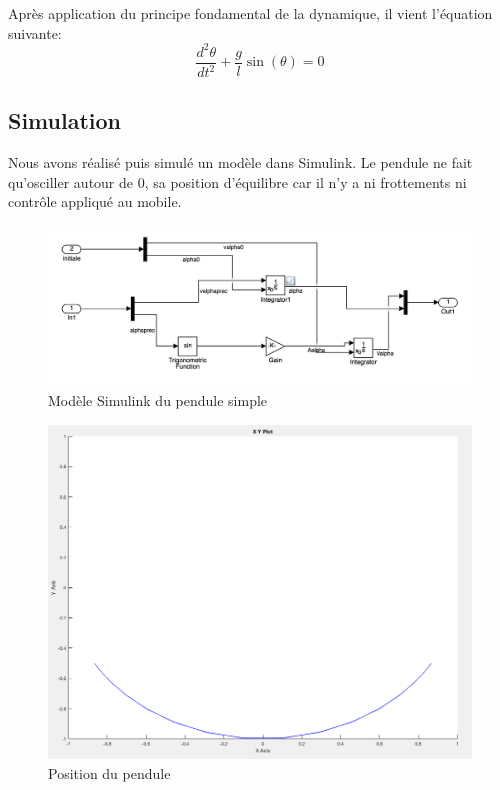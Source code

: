 \documentclass[11pt]{article}
\begin{document}
Après application du principe fondamental de la dynamique, il vient l'équation suivante: 
\begin{equation}
	\frac{d^2\theta}{dt^2} + \frac{g}{l}\sin(\theta)=0
\end{equation}

\subsection{Simulation}
Nous avons réalisé puis simulé un modèle dans Simulink. Le pendule ne fait qu'osciller autour de 0, sa position d'équilibre car il n'y a ni frottements ni contrôle appliqué au mobile.
\begin{figure}[H]
	\includegraphics[scale=0.3]{images/pendule_simple_sys}
	\caption{Modèle Simulink du pendule simple}
	\label{model_pendule_simu}
\end{figure}
\begin{figure}[H]
	\includegraphics[scale=0.3]{images/pendule_simple_XY}
	\caption{Position du pendule}
	\label{simu_pendule_xy}
\end{figure} 
\end{document}
